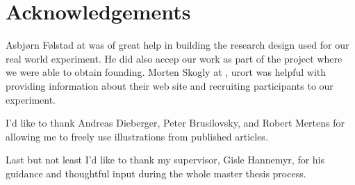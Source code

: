\chapter{Acknowledgements}

Asbj\o{}rn F\o{}lstad at  was of great help in building the
research design used for our real world experiment.
He did also accep our work as part of the  project where we
were able to obtain founding.
Morten Skogly at ,
urort{} was helpful with providing information about their web site and
recruiting participants to our experiment.

I'd like to thank
Andreas Dieberger,
Peter Brusilovsky, and
Robert Mer\-t\-ens
for allowing me to freely use illustrations from
published articles.

Last but not least I'd like to thank my supervisor, Gisle Hannemyr, for
his guidance and thoughtful input during the whole master thesis process.
